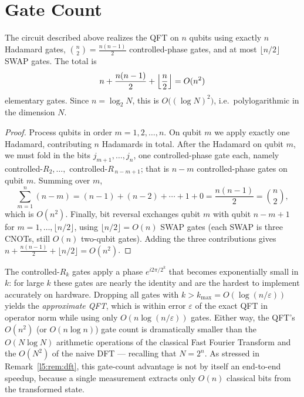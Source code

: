 \section{Gate Count}

\begin{theorem}\label{l5:thm:count}
The circuit described above realizes the QFT on $n$ qubits using exactly $n$
Hadamard gates, $\binom{n}{2} = \tfrac{n(n-1)}{2}$ controlled-phase gates, and at
most $\lfloor n/2\rfloor$ SWAP gates. The total is
\[
  n + \frac{n(n-1)}{2} + \Bigl\lfloor\frac n2\Bigr\rfloor = O(n^{2})
\]
elementary gates. Since $n = \log_2 N$, this is $O\bigl((\log N)^{2}\bigr)$,
i.e.\ polylogarithmic in the dimension $N$.
\end{theorem}

\begin{proof}
Process qubits in order $m = 1,2,\dots,n$. On qubit $m$ we apply exactly one
Hadamard, contributing $n$ Hadamards in total. After the Hadamard on qubit $m$,
we must fold in the bits $j_{m+1},\dots,j_n$, one controlled-phase gate each,
namely controlled-$R_2,\dots,$ controlled-$R_{\,n-m+1}$; that is $n-m$
controlled-phase gates on qubit $m$. Summing over $m$,
\[
  \sum_{m=1}^{n} (n-m) = (n-1)+(n-2)+\cdots+1+0
   = \frac{n(n-1)}{2} = \binom{n}{2},
\]
which is $O(n^2)$. Finally, bit reversal exchanges qubit $m$ with qubit $n-m+1$
for $m=1,\dots,\lfloor n/2\rfloor$, using $\lfloor n/2\rfloor = O(n)$ SWAP gates
(each SWAP is three CNOTs, still $O(n)$ two-qubit gates). Adding the three
contributions gives $n + \tfrac{n(n-1)}{2} + \lfloor n/2\rfloor = O(n^2)$.
\end{proof}

\begin{remark}\label{l5:rem:approx}
The controlled-$R_k$ gates apply a phase $e^{i2\pi/2^{k}}$ that becomes
exponentially small in $k$: for large $k$ these gates are nearly the identity
and are the hardest to implement accurately on hardware. Dropping all gates with
$k > k_{\max} = O(\log(n/\varepsilon))$ yields the \emph{approximate QFT}, which
is within error $\varepsilon$ of the exact QFT in operator norm while using only
$O(n\log(n/\varepsilon))$ gates. Either way, the QFT's $O(n^2)$ (or
$O(n\log n)$) gate count is dramatically smaller than the $O(N\log N)$
arithmetic operations of the classical Fast Fourier Transform and the $O(N^2)$
of the naive DFT --- recalling that $N = 2^n$. As stressed in
Remark~\ref{l5:rem:dft}, this gate-count advantage is not by itself an end-to-end
speedup, because a single measurement extracts only $O(n)$ classical bits from
the transformed state.
\end{remark}

